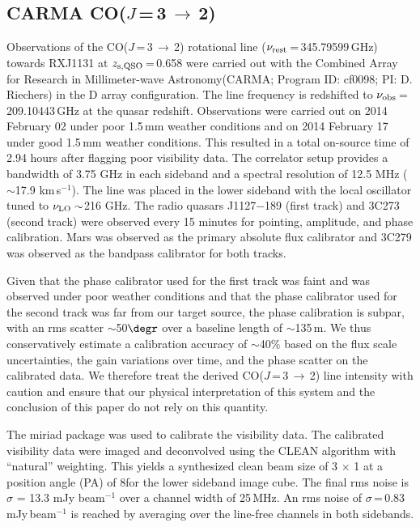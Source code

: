 \documentclass[]{emulateapj}
\newcommand{\rarr}{$\rightarrow$}
\newcommand{\cco}{\mbox{CO($J$\,=\,3\,\rarr\,2)}\xspace}
\newcommand{\kms}{\mbox{km\,s$^{-1}$}\xspace}
\newcommand{\pmOne}{\mbox{$^{-1}$}\xspace}
\newcommand{\eq}{\,=\,}
\def\carma    {Combined Array for Research in Millimeter-wave Astronomy\xspace}
\newcommand{\ncode}[1]{{\sc #1}}
\begin{document}
\subsection{CARMA \cco}
Observations of the \cco rotational line
($\nu_{\rm rest}$\,=\,345.79599\,GHz) towards RXJ1131 at $z_{\rm s, QSO}$\eq0.658
were carried out with the \carma (CARMA;
Program ID: cf0098; PI: D. Riechers) in the D array configuration.
The line frequency is redshifted to $\nu_{\rm obs}$\eq209.10443\,GHz at the quasar redshift.
Observations were carried out
on 2014 February 02 under poor 1.5\,mm
weather conditions and on 2014 February 17 under good 1.5\,mm
weather conditions.
This resulted in a
total on-source time of 2.94 hours after flagging poor
visibility data.
The correlator setup provides a bandwidth of 3.75 GHz in
each sideband and a
spectral resolution of 12.5 MHz ($\sim$17.9 \kms). The
line was placed in the lower sideband with the local oscillator tuned to $\nu_{\rm LO}\sim$216 GHz. The radio quasars J1127$-$189 (first track) and 3C273
(second track) were observed
every 15 minutes for pointing, amplitude, and phase calibration. Mars was
observed as the primary absolute flux calibrator and 3C279 was observed as
the bandpass calibrator for both tracks.

Given that the phase calibrator used for the first track was faint and was
observed under poor weather conditions and that the phase calibrator used for
the second track was far from our target source, the phase calibration is
subpar, with an rms scatter $\sim$50$\degr$ over a baseline length of $\sim$135\,m.
We thus conservatively estimate
a calibration accuracy of $\sim$40\% based on the flux scale uncertainties,    %
the gain variations over time, and the phase scatter on the calibrated data. We
therefore treat the derived \cco line intensity with caution and ensure that our physical interpretation
of this system and the conclusion of this paper do not rely on this quantity.

The \ncode{miriad} package was used to calibrate the visibility data.
The calibrated visibility data were
imaged and deconvolved using the CLEAN algorithm with ``natural'' weighting. This yields a synthesized clean
beam size of 3 $\times$ 1 at a position angle (PA) of 8\degr for the lower sideband
image cube. The final rms noise is $\sigma$ = 13.3 mJy beam$^{-1}$
over a channel width of 25\,MHz. An rms noise of
$\sigma$\,=\,0.83\,mJy\,beam\pmOne is reached by averaging over the
line-free channels in both sidebands.
\end{document}
